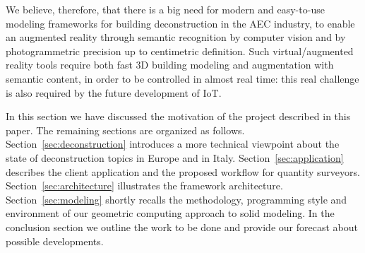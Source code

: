 We believe, therefore, that there is a big need for modern and easy-to-use modeling frameworks for building deconstruction in the AEC industry, to enable an augmented reality through semantic recognition by computer vision and by photogrammetric precision up to centimetric definition. Such virtual/augmented reality tools require both fast 3D building modeling and augmentation with semantic content, in order to be controlled in almost real time: this real challenge is also required by the future development of IoT. 	       
 
In this section we have discussed the motivation of the project described in this paper. The remaining sections are organized as follows.
Section~\ref{sec:deconstruction} introduces a more technical viewpoint about the state of deconstruction topics in Europe and in Italy.
Section~\ref{sec:application} describes the client application and the proposed workflow for quantity surveyors.
Section~\ref{sec:architecture} illustrates the framework architecture. 
Section~\ref{sec:modeling} shortly recalls the methodology, programming style and environment of our geometric computing approach to solid modeling.
In the conclusion section we outline the work to be done and provide our forecast about possible developments.
